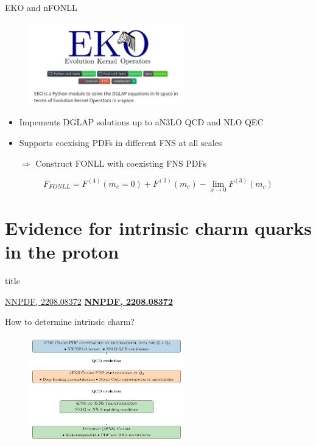 \documentclass[aspectratio=43, 8pt,t]{beamer}
\newcommand{\SectionTitleFrame}[1][]{%
  \begin{frame}
    \vfill
    \centering
    \begin{beamercolorbox}[sep=8pt,center,shadow=true,rounded=true]{title}
      \usebeamerfont{title}\insertsection\par
    \end{beamercolorbox}
    \ifx\relax#1\relax\else
      \vspace{0.5cm}
      \textbf{#1}
    \fi
    \vfill
  \end{frame}
}
\begin{document}
\begin{frame}{EKO and nFONLL}
  \begin{figure}
    \includegraphics[width=0.6\textwidth]{eko_header.png}
  \end{figure}
  \begin{itemize}
    \item Impements DGLAP solutions up to aN3LO QCD and NLO QEC
    \item Supports coexising PDFs in different FNS at all scales
    \item[$\Rightarrow$] Construct FONLL with coexisting FNS PDFs
  \end{itemize}

  $$F_{FONLL} = F^{(4)}(m_c=0) + F^{(3)}(m_c) - \lim_{x\rightarrow 0} F^{(3)}(m_c)$$
\end{frame}


\section*{Evidence for intrinsic charm quarks in the proton}
\SectionTitleFrame[\hyperlink{https://arxiv.org/abs/2208.08372}{NNPDF, 2208.08372}]

\begin{frame}{How to determine intrinsic charm?}
  \begin{figure}
    \includegraphics[width=0.6\textwidth]{strategy.pdf}
  \end{figure}

\end{frame}
\end{document}
